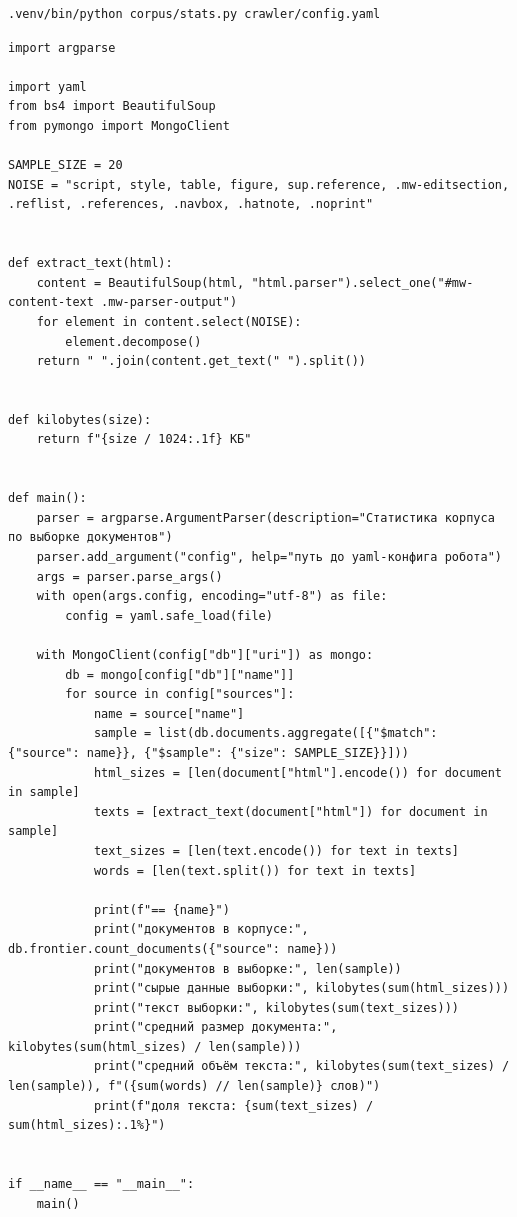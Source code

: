 \documentclass[12pt,a4paper,oneside,fleqn]{article}
\begin{document}
\begin{lstlisting}[style=plaintext]
.venv/bin/python corpus/stats.py crawler/config.yaml
\end{lstlisting}

\begin{lstlisting}
import argparse

import yaml
from bs4 import BeautifulSoup
from pymongo import MongoClient

SAMPLE_SIZE = 20
NOISE = "script, style, table, figure, sup.reference, .mw-editsection, .reflist, .references, .navbox, .hatnote, .noprint"


def extract_text(html):
    content = BeautifulSoup(html, "html.parser").select_one("#mw-content-text .mw-parser-output")
    for element in content.select(NOISE):
        element.decompose()
    return " ".join(content.get_text(" ").split())


def kilobytes(size):
    return f"{size / 1024:.1f} КБ"


def main():
    parser = argparse.ArgumentParser(description="Статистика корпуса по выборке документов")
    parser.add_argument("config", help="путь до yaml-конфига робота")
    args = parser.parse_args()
    with open(args.config, encoding="utf-8") as file:
        config = yaml.safe_load(file)

    with MongoClient(config["db"]["uri"]) as mongo:
        db = mongo[config["db"]["name"]]
        for source in config["sources"]:
            name = source["name"]
            sample = list(db.documents.aggregate([{"$match": {"source": name}}, {"$sample": {"size": SAMPLE_SIZE}}]))
            html_sizes = [len(document["html"].encode()) for document in sample]
            texts = [extract_text(document["html"]) for document in sample]
            text_sizes = [len(text.encode()) for text in texts]
            words = [len(text.split()) for text in texts]

            print(f"== {name}")
            print("документов в корпусе:", db.frontier.count_documents({"source": name}))
            print("документов в выборке:", len(sample))
            print("сырые данные выборки:", kilobytes(sum(html_sizes)))
            print("текст выборки:", kilobytes(sum(text_sizes)))
            print("средний размер документа:", kilobytes(sum(html_sizes) / len(sample)))
            print("средний объём текста:", kilobytes(sum(text_sizes) / len(sample)), f"({sum(words) // len(sample)} слов)")
            print(f"доля текста: {sum(text_sizes) / sum(html_sizes):.1%}")


if __name__ == "__main__":
    main()
\end{lstlisting}
\end{document}
